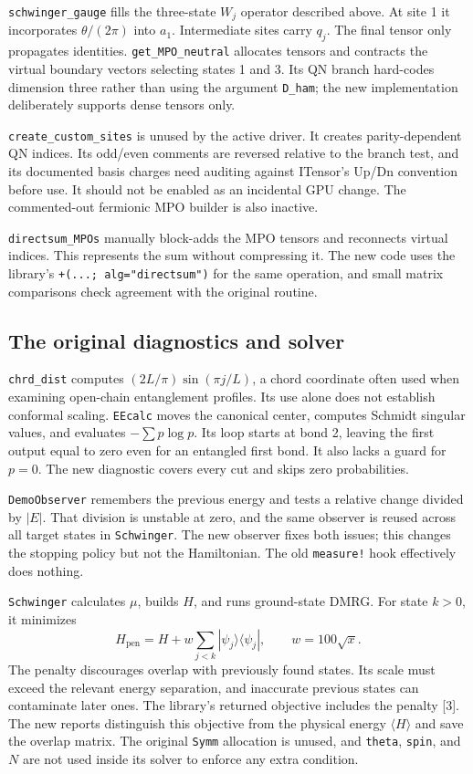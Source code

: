 \documentclass[11pt]{article}
\newcommand{\code}[1]{\nolinkurl{#1}}
\begin{document}
\code{schwinger_gauge} fills the three-state $W_j$ operator described above. At site 1 it incorporates $\theta/(2\pi)$ into $a_1$. Intermediate sites carry $q_j$. The final tensor only propagates identities. \code{get_MPO_neutral} allocates tensors and contracts the virtual boundary vectors selecting states 1 and 3. Its QN branch hard-codes dimension three rather than using the argument \code{D_ham}; the new implementation deliberately supports dense tensors only.

\code{create_custom_sites} is unused by the active driver. It creates parity-dependent QN indices. Its odd/even comments are reversed relative to the branch test, and its documented basis charges need auditing against ITensor's Up/Dn convention before use. It should not be enabled as an incidental GPU change. The commented-out fermionic MPO builder is also inactive.

\code{directsum_MPOs} manually block-adds the MPO tensors and reconnects virtual indices. This represents the sum without compressing it. The new code uses the library's \code{+(...; alg="directsum")} for the same operation, and small matrix comparisons check agreement with the original routine.

\subsection{The original diagnostics and solver}
\code{chrd_dist} computes $(2L/\pi)\sin(\pi j/L)$, a chord coordinate often used when examining open-chain entanglement profiles. Its use alone does not establish conformal scaling. \code{EEcalc} moves the canonical center, computes Schmidt singular values, and evaluates $-\sum p\log p$. Its loop starts at bond 2, leaving the first output equal to zero even for an entangled first bond. It also lacks a guard for $p=0$. The new diagnostic covers every cut and skips zero probabilities.

\code{DemoObserver} remembers the previous energy and tests a relative change divided by $|E|$. That division is unstable at zero, and the same observer is reused across all target states in \code{Schwinger}. The new observer fixes both issues; this changes the stopping policy but not the Hamiltonian. The old \code{measure!} hook effectively does nothing.

\code{Schwinger} calculates $\mu$, builds $H$, and runs ground-state DMRG. For state $k>0$, it minimizes
\begin{equation}
H_{\mathrm{pen}}=H+w\sum_{j<k}|\psi_j\rangle\langle\psi_j|,
\qquad w=100\sqrt{x}.
\end{equation}
The penalty discourages overlap with previously found states. Its scale must exceed the relevant energy separation, and inaccurate previous states can contaminate later ones. The library's returned objective includes the penalty [3]. The new reports distinguish this objective from the physical energy $\langle H\rangle$ and save the overlap matrix. The original \code{Symm} allocation is unused, and \code{theta}, \code{spin}, and $N$ are not used inside its solver to enforce any extra condition.

\end{document}
